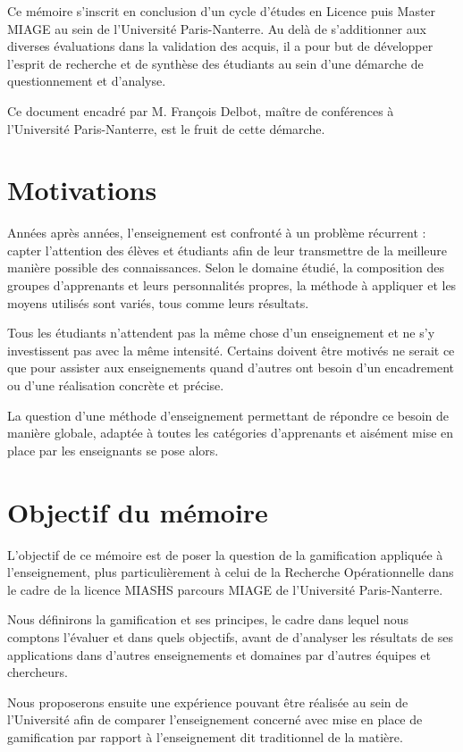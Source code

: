Ce mémoire s'inscrit en conclusion d'un cycle d'études en Licence puis Master MIAGE au sein de l'Université Paris-Nanterre. Au delà de s'additionner aux diverses évaluations dans la validation des acquis, il a pour but de développer l'esprit de recherche et de synthèse des étudiants au sein d'une démarche de questionnement et d'analyse.\par
Ce document encadré par M. François Delbot, maître de conférences à l'Université Paris-Nanterre, est le fruit de cette démarche.

\section{Motivations}
Années après années, l'enseignement est confronté à un problème récurrent : capter l'attention des élèves et étudiants afin de leur transmettre de la meilleure manière possible des connaissances. Selon le domaine étudié, la composition des groupes d'apprenants et leurs personnalités propres, la méthode à appliquer et les moyens utilisés sont variés, tous comme leurs résultats. \par
Tous les étudiants n'attendent pas la même chose d'un enseignement et ne s'y investissent pas avec la même intensité. Certains doivent être motivés ne serait ce que pour assister aux enseignements quand d'autres ont besoin d'un encadrement ou d'une réalisation concrète et précise. \par
La question d'une méthode d'enseignement permettant de répondre ce besoin de manière globale, adaptée à toutes les catégories d'apprenants et aisément mise en place par les enseignants se pose alors.

\section{Objectif du mémoire}
L'objectif de ce mémoire est de poser la question de la gamification appliquée à l'enseignement, plus particulièrement à celui de la Recherche Opérationnelle dans le cadre de la licence MIASHS parcours MIAGE de l'Université Paris-Nanterre. \par
Nous définirons la gamification et ses principes, le cadre dans lequel nous comptons l'évaluer et dans quels objectifs, avant de d'analyser les résultats de ses applications dans d'autres enseignements et domaines par d'autres équipes et chercheurs. \par
Nous proposerons ensuite une expérience pouvant être réalisée au sein de l'Université afin de comparer l'enseignement concerné avec mise en place de gamification par rapport à l'enseignement dit traditionnel de la matière.